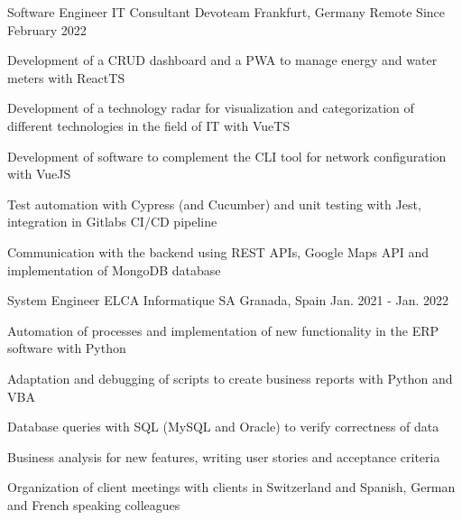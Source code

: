 

\begin{cventries}

  \cventry
    {Software Engineer {\enskip\cdotp\enskip} IT Consultant} %
    {Devoteam} %
    {Frankfurt, Germany {\enskip\cdotp\enskip} Remote} %
    {Since February 2022} %
    {
      \begin{cvitems} %
        \item {Development of a CRUD dashboard and a PWA to manage energy and water meters with ReactTS}
        \item {Development of a technology radar for visualization and categorization of different technologies in the field of IT with VueTS}
        \item {Development of software to complement the CLI tool for network configuration with VueJS}
        \item {Test automation with Cypress (and Cucumber) and unit testing with Jest, integration in Gitlabs CI/CD pipeline}
        \item {Communication with the backend using REST APIs, Google Maps API and implementation of MongoDB database}
      \end{cvitems}
    }

  \cventry
    {System Engineer} %
    {ELCA Informatique SA} %
    {Granada, Spain} %
    {Jan. 2021 - Jan. 2022} %
    {
      \begin{cvitems} %
        \item {Automation of processes and implementation of new functionality in the ERP software with Python}
        \item {Adaptation and debugging of scripts to create business reports with Python and VBA}
        \item {Database queries with SQL (MySQL and Oracle) to verify correctness of data}
        \item {Business analysis for new features, writing user stories and acceptance criteria}
        \item {Organization of client meetings with clients in Switzerland and Spanish, German and French speaking colleagues}
      \end{cvitems}
    }


\end{cventries}
